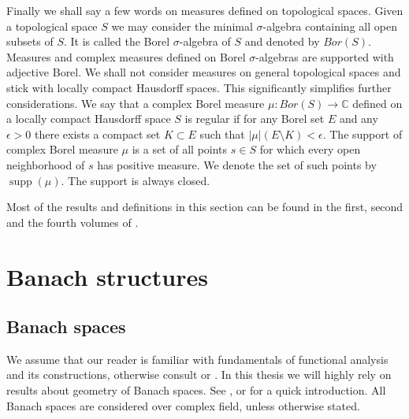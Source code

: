 Finally we shall say a few words on measures defined on topological spaces. Given a topological space $S$ we may consider the minimal $\sigma$-algebra containing all open subsets of $S$. It is called the Borel $\sigma$-algebra of $S$ and denoted by $Bor(S)$. Measures and complex measures defined on Borel $\sigma$-algebras are supported with adjective Borel. We shall not consider measures on general topological spaces and stick with locally compact Hausdorff spaces. This significantly simplifies further considerations. We say that a complex Borel measure $\mu:Bor(S)\to\mathbb{C}$ defined on a locally compact Hausdorff space $S$ is regular if for any Borel set $E$ and any $\epsilon>0$ there exists a compact set $K\subset E$ such that $|\mu|(E\setminus K)<\epsilon$. The support of complex Borel measure $\mu$ is a set of all points $s\in S$ for which every open neighborhood of $s$ has positive measure. We denote the set of such points by $\operatorname{supp}(\mu)$. The support is always closed. 

Most of the results and definitions in this section can be found in the first, second and the fourth volumes of \cite{FremMeasTh}.


\section{Banach structures}

\label{SectionBanachStructures}


\subsection{Banach spaces}
\label{SubSectionBanachSpaces}

We assume that our reader is familiar with fundamentals of functional analysis and its constructions, otherwise consult \cite{HelLectAndExOnFuncAn} or \cite{ConwACoursInFuncAn}. In this thesis we will highly rely on results about geometry of Banach spaces. See \cite{CarothShortCourseBanSp}, \cite{KalAlbTopicsBanSpTh} or \cite{FabHabBanSpTh} for a quick introduction. All Banach spaces are considered over complex field, unless otherwise stated. 

